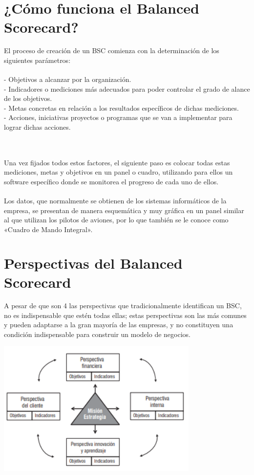 \section*{¿Cómo funciona el Balanced Scorecard?}
\item{El proceso de creación de un BSC comienza con la determinación de los siguientes parámetros:
\\
\textbf{}
\\
- Objetivos a alcanzar por la organización.\\
- Indicadores o mediciones más adecuados para poder controlar el grado de alance de los objetivos.\\
- Metas concretas en relación a los resultados específicos de dichas mediciones.\\
- Acciones, iniciativas proyectos o programas que se van a implementar para lograr dichas acciones.

\\
\textbf{}
\\
Una vez fijados todos estos factores, el siguiente paso es colocar todas estas mediciones, metas y objetivos en un panel o cuadro, utilizando para ellos un software específico donde se monitorea el progreso de cada uno de ellos.
\\
\textbf{}
\\
Los datos, que normalmente se obtienen de los sistemas informáticos de la empresa, se presentan de manera esquemática y muy gráfica en un panel similar al que utilizan los pilotos de aviones, por lo que también se le conoce como «Cuadro de Mando Integral».}

\section*{Perspectivas del Balanced Scorecard}
\item{A pesar de que son 4 las perspectivas que tradicionalmente identifican un BSC, no es indispensable que estén todas ellas; estas perspectivas son las más comunes y pueden adaptarse a la gran mayoría de las empresas, y no constituyen una condición indispensable para construir un modelo de negocios.}

\begin{center}
\includegraphics[width=10cm]{./Imagenes/img2}
\end{center}

